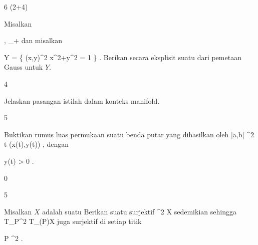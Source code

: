 {6 (2+4)}
{

Misalkan

\mavergleichskette
{\vergleichskette
{ \alpha,\beta
}
{ \in }{ \R_+
}
{  }{
}
{    }{
}
{   }{
}
}
{}{}{}
dan misalkan

\mavergleichskettedisp
{\vergleichskette
{ Y
}
{ =} { \left\{ (x,y)\in\R^2  \mid   \alpha x^2+\beta y^2 = 1        \right\}
}
{ } {
}
{ } {
}
{ } {
}
}
{}{}{.}
 { Berikan secara eksplisit suatu
dari pemetaan Gauss untuk $Y$.
}

}
{} {}

{4}
{

Jelaskan pasangan istilah  dalam konteks manifold.

}
{} {}

{5}
{

Buktikan rumus luas permukaan suatu benda putar yang dihasilkan oleh
\maabbeledisp {\gamma} {]a,b[} {\R^2
} { t } {(x(t),y(t))
} {,}
dengan

\mavergleichskette
{\vergleichskette
{ y(t)
}
{ > }{ 0
}
{  }{
}
{    }{
}
{   }{
}
}
{}{}{.}

}
{} {}

{0}
{

}
{} {}

{5}
{

Misalkan $X$ adalah suatu
Berikan suatu
surjektif
\maabbdisp {\varphi} {\R^2} {X
} {}
sedemikian sehingga
 { T_P\R^2 } { T_{\varphi(P)}X
} {}
juga surjektif di setiap titik

\mavergleichskette
{\vergleichskette
{ P
}
{ \in }{ \R^2
}
{  }{
}
{    }{
}
{   }{
}
}
{}{}{.}

}
{} {}

